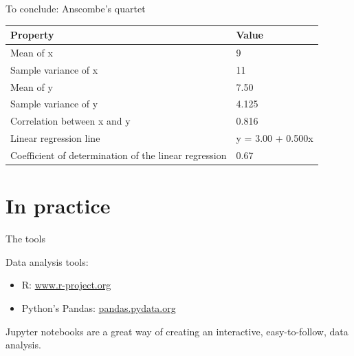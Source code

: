 \documentclass[compress]{beamer}
\begin{document}
\begin{frame}{To conclude: Anscombe's quartet}
{        \begin{tabular}{@{}p{6cm}l@{}}
\toprule
\textbf{Property}                                     & \textbf{Value}    \\ \midrule
Mean of x                                             & 9                 \\
Sample variance of x                                  & 11                \\
Mean of y                                             & 7.50              \\
Sample variance of y                                  & 4.125             \\
Correlation between x and y                           & 0.816             \\
Linear regression line                                & y = 3.00 + 0.500x \\
Coefficient of determination of the linear regression & 0.67              \\ \bottomrule
\end{tabular}
}
\end{frame}


\section{In practice}



\begin{frame}{The tools}

    Data analysis tools:

    \begin{itemize}
        \item R: \url{www.r-project.org}
        \item Python's Pandas: \url{pandas.pydata.org}
    \end{itemize}

    \pause

    Jupyter notebooks are a  great way of creating an interactive, easy-to-follow,
    data analysis.

\end{frame}
\end{document}
